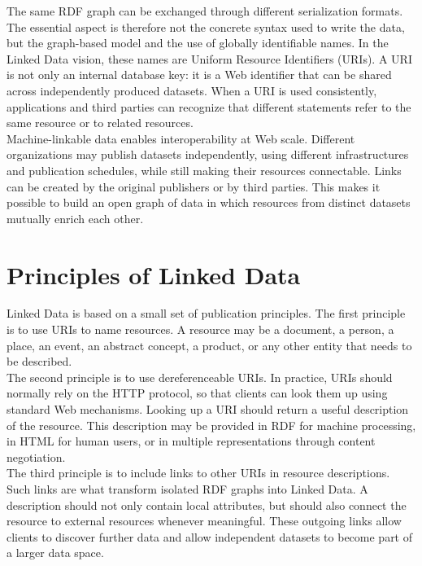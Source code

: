 \documentclass{scrbook}
\begin{document}
	The same RDF graph can be exchanged through different serialization formats. The essential aspect is therefore not the concrete syntax used to write the data, but the graph-based model and the use of globally identifiable names. In the Linked Data vision, these names are Uniform Resource Identifiers (URIs). A URI is not only an internal database key: it is a Web identifier that can be shared across independently produced datasets. When a URI is used consistently, applications and third parties can recognize that different statements refer to the same resource or to related resources.\\
	
	Machine-linkable data enables interoperability at Web scale. Different organizations may publish datasets independently, using different infrastructures and publication schedules, while still making their resources connectable. Links can be created by the original publishers or by third parties. This makes it possible to build an open graph of data in which resources from distinct datasets mutually enrich each other.
	
	\section{Principles of Linked Data}
	
	Linked Data is based on a small set of publication principles. The first principle is to use URIs to name resources. A resource may be a document, a person, a place, an event, an abstract concept, a product, or any other entity that needs to be described.\\
	
	The second principle is to use dereferenceable URIs. In practice, URIs should normally rely on the HTTP protocol, so that clients can look them up using standard Web mechanisms. Looking up a URI should return a useful description of the resource. This description may be provided in RDF for machine processing, in HTML for human users, or in multiple representations through content negotiation.\\
	
	The third principle is to include links to other URIs in resource descriptions. Such links are what transform isolated RDF graphs into Linked Data. A description should not only contain local attributes, but should also connect the resource to external resources whenever meaningful. These outgoing links allow clients to discover further data and allow independent datasets to become part of a larger data space.\\
	
\end{document}
